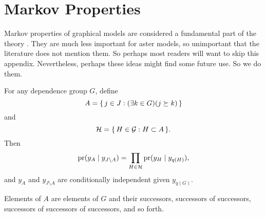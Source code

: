 
\chapter{Markov Properties}
\label{app:markov}

Markov properties of graphical models are considered a fundamental part
of the theory \citep[Section~3.2]{lauritzen}.  They are much less important
for aster models, so unimportant that the literature does not mention them.
So perhaps most readers will want to skip this appendix.  Nevertheless,
perhaps these ideas might find some future use.  So we do them.

\begin{theorem} \label{th:markov-one}
For any dependence group $G$, define
$$
   A = \{\,  j \in J : (\exists k \in G)(j \succeq k)  \,\}
$$
and
$$
   \mathcal{H} = \{\,  H \in \mathcal{G} : H \subset A  \,\}.
$$
Then
\begin{equation} \label{eq:markov-one}
   \operatorname{pr}(y_{A} \mid y_{J \setminus A})
   =
   \prod_{H \in \mathcal{H}} \operatorname{pr}(y_H \mid y_{q(H)}),
\end{equation}
and $y_A$ and $y_{J \setminus A}$ are conditionally
independent given $y_{q(G)}$.
\end{theorem}
Elements of $A$ are elements of $G$ and their successors,
successors of successors, successors of successors of successors, and so forth.
